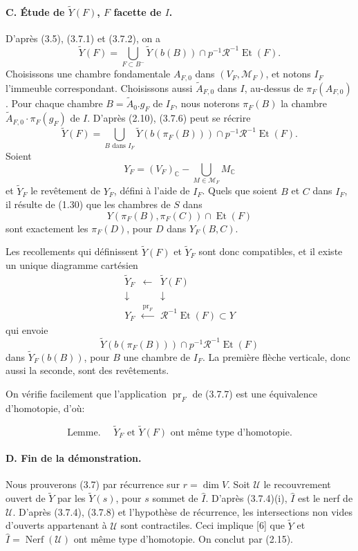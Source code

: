 \documentclass[10pt]{article}
\newcommand{\C}{\mathbb C}
\begin{document}
\paragraph{C. Étude de \(\widetilde Y(F)\), \(F\) facette de \(I\).} D'après (3.5), (3.7.1) et (3.7.2), on a
\[
\tag{3.7.6}
\widetilde Y(F)=
\bigcup_{F\subset B^-}
\widetilde Y(b(B))\cap p^{-1}\mathcal R^{-1}\operatorname{Et}(F).
\]
Choisissons une chambre fondamentale \(A_{F,0}\) dans \((V_F,\mathcal M_F)\), et notons \(I_F\) l'immeuble correspondant. Choisissons aussi \(\widetilde A_{F,0}\) dans \(I\), au-dessus de \(\pi_F(A_{F,0})\). Pour chaque chambre \(B=\widetilde A_0.g_F\) de \(I_F\), nous noterons \(\pi_F(B)\) la chambre \(\widetilde A_{F,0}\cdot\pi_F(g_F)\) de \(I\). D'après (2.10), (3.7.6) peut se récrire
\[
\widetilde Y(F)=
\bigcup_{B\text{ dans }I_F}
\widetilde Y(b(\pi_F(B)))\cap p^{-1}\mathcal R^{-1}\operatorname{Et}(F).
\]
Soient
\[
Y_F=(V_F)_\C-\bigcup_{M\in\mathcal M_F}M_\C
\]
et \(\widetilde Y_F\) le revêtement de \(Y_F\), défini à l'aide de \(I_F\). Quels que soient \(B\) et \(C\) dans \(I_F\), il résulte de (1.30) que les chambres de \(S\) dans
\[
Y(\pi_F(B),\pi_F(C))\cap\operatorname{Et}(F)
\]
sont exactement les \(\pi_F(D)\), pour \(D\) dans \(Y_F(B,C)\).

Les recollements qui définissent \(\widetilde Y(F)\) et \(\widetilde Y_F\) sont donc compatibles, et il existe un unique diagramme cartésien
\[
\tag{3.7.7}
\begin{array}{ccc}
\widetilde Y_F&\longleftarrow&\widetilde Y(F)\\
\downarrow&&\downarrow\\
Y_F&\xleftarrow{\operatorname{pr}_F}&\mathcal R^{-1}\operatorname{Et}(F)\subset Y
\end{array}
\]
qui envoie
\[
\widetilde Y(b(\pi_F(B)))\cap p^{-1}\mathcal R^{-1}\operatorname{Et}(F)
\]
dans \(\widetilde Y_F(b(B))\), pour \(B\) une chambre de \(I_F\). La première flèche verticale, donc aussi la seconde, sont des revêtements.

On vérifie facilement que l'application \(\operatorname{pr}_F\) de (3.7.7) est une équivalence d'homotopie, d'où:

\[
\tag{3.7.8}
\text{Lemme. }\quad
\widetilde Y_F\text{ et }\widetilde Y(F)\text{ ont même type d'homotopie.}
\]

\paragraph{D. Fin de la démonstration.} Nous prouverons (3.7) par récurrence sur \(r=\dim V\). Soit \(\mathcal U\) le recouvrement ouvert de \(\widetilde Y\) par les \(\widetilde Y(s)\), pour \(s\) sommet de \(\widehat I\). D'après (3.7.4)(i), \(\widehat I\) est le nerf de \(\mathcal U\). D'après (3.7.4), (3.7.8) et l'hypothèse de récurrence, les intersections non vides d'ouverts appartenant à \(\mathcal U\) sont contractiles. Ceci implique [6] que \(\widetilde Y\) et \(\widehat I=\operatorname{Nerf}(\mathcal U)\) ont même type d'homotopie. On conclut par (2.15).
\end{document}

